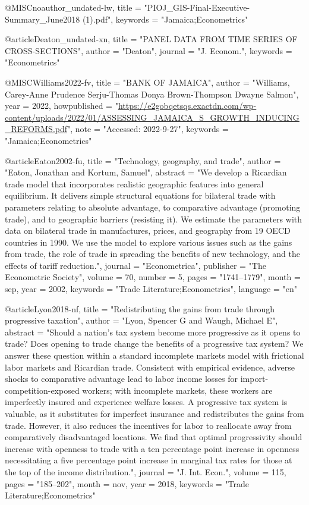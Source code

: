 {@MISC{noauthor_undated-lw,
	title    = "{PIOJ\_GIS-Final-Executive-Summary\_June2018} (1).pdf",
	keywords = "Jamaica;Econometrics"
}

@article{Deaton_undated-xn,
	title    = "{PANEL} {DATA} {FROM} {TIME} {SERIES} {OF} {CROSS-SECTIONS}",
	author   = "{Deaton}",
	journal  = "J. Econom.",
	keywords = "Econometrics"
}

@MISC{Williams2022-fv,
	title        = "{BANK} {OF} {JAMAICA}",
	author       = "Williams, Carey-Anne Prudence Serju-Thomas Donya
	Brown-Thompson Dwayne Salmon",
	year         =  2022,
	howpublished = "\url{https://e2gobqetsqs.exactdn.com/wp-content/uploads/2022/01/ASSESSING_JAMAICA_S_GROWTH_INDUCING_REFORMS.pdf}",
	note         = "Accessed: 2022-9-27",
	keywords     = "Jamaica;Econometrics"
}

@article{Eaton2002-fu,
	title     = "Technology, geography, and trade",
	author    = "Eaton, Jonathan and Kortum, Samuel",
	abstract  = "We develop a Ricardian trade model that incorporates realistic
	geographic features into general equilibrium. It delivers simple
	structural equations for bilateral trade with parameters
	relating to absolute advantage, to comparative advantage
	(promoting trade), and to geographic barriers (resisting it). We
	estimate the parameters with data on bilateral trade in
	manufactures, prices, and geography from 19 OECD countries in
	1990. We use the model to explore various issues such as the
	gains from trade, the role of trade in spreading the benefits of
	new technology, and the effects of tariff reduction.",
	journal   = "Econometrica",
	publisher = "The Econometric Society",
	volume    =  70,
	number    =  5,
	pages     = "1741--1779",
	month     =  sep,
	year      =  2002,
	keywords  = "Trade Literature;Econometrics",
	language  = "en"
}

@article{Lyon2018-nf,
	title    = "Redistributing the gains from trade through progressive taxation",
	author   = "Lyon, Spencer G and Waugh, Michael E",
	abstract = "Should a nation's tax system become more progressive as it opens
	to trade? Does opening to trade change the benefits of a
	progressive tax system? We answer these question within a
	standard incomplete markets model with frictional labor markets
	and Ricardian trade. Consistent with empirical evidence, adverse
	shocks to comparative advantage lead to labor income losses for
	import-competition-exposed workers; with incomplete markets,
	these workers are imperfectly insured and experience welfare
	losses. A progressive tax system is valuable, as it substitutes
	for imperfect insurance and redistributes the gains from trade.
	However, it also reduces the incentives for labor to reallocate
	away from comparatively disadvantaged locations. We find that
	optimal progressivity should increase with openness to trade with
	a ten percentage point increase in openness necessitating a five
	percentage point increase in marginal tax rates for those at the
	top of the income distribution.",
	journal  = "J. Int. Econ.",
	volume   =  115,
	pages    = "185--202",
	month    =  nov,
	year     =  2018,
	keywords = "Trade Literature;Econometrics"
}

}
